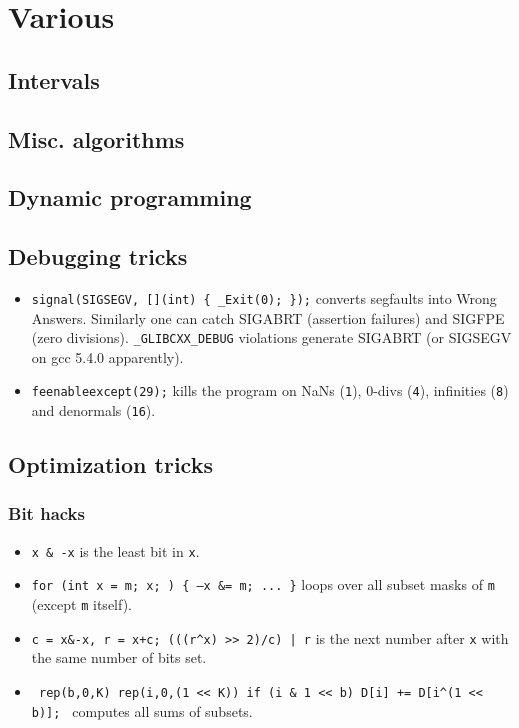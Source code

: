 \chapter{Various}

\section{Intervals}

\section{Misc. algorithms}

\section{Dynamic programming}

\section{Debugging tricks}
	\begin{itemize}
		\item \texttt{signal(SIGSEGV, [](int) \{ \_Exit(0); \});} converts segfaults into Wrong Answers.
			Similarly one can catch SIGABRT (assertion failures) and SIGFPE (zero divisions).
			\texttt{\_GLIBCXX\_DEBUG} violations generate SIGABRT (or SIGSEGV on gcc 5.4.0 apparently).
		\item \texttt{feenableexcept(29);} kills the program on NaNs (\texttt 1), 0-divs (\texttt 4), infinities (\texttt 8) and denormals (\texttt{16}).
	\end{itemize}

\section{Optimization tricks}
	\subsection{Bit hacks}
		\begin{itemize}
			\item \texttt{x \& -x} is the least bit in \texttt{x}.
			\item \texttt{for (int x = m; x; ) \{ --x \&= m; ... \}} loops over all subset masks of \texttt{m} (except \texttt{m} itself).
			\item \texttt{c = x\&-x, r = x+c; (((r\^{}x) >> 2)/c) | r} is the next number after \texttt{x} with the same number of bits set.
			\item \texttt{ rep(b,0,K) rep(i,0,(1 << K)) if (i \& 1 << b) D[i] += D[i\^{}(1 << b)]; } computes all sums of subsets.
		\end{itemize}
